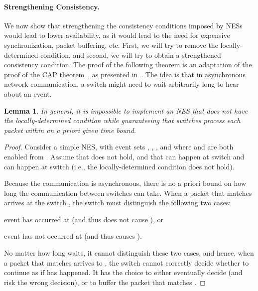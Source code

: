 \documentclass[pldi-cameraready]{sigplanconf}
\newcommand*\xmnote[3][0pt]{}
\newtheorem{lemma}{Lemma}
\begin{document}
\paragraph*{Strengthening Consistency.}
\renewcommand*{\proofname}{Proof Sketch}We now show that strengthening the consistency conditions imposed by
NESs would lead to lower availability, as it would lead to the need
for expensive synchronization, packet buffering, etc. First, we will
try to remove the locally-determined condition, and second, we will try to obtain a
strengthened consistency condition. The proof of the following theorem
is an adaptation of the proof of the CAP theorem~\cite{B00}, as
presented in~\cite{GL12}. The idea is that in asynchronous network
communication, a switch might need to wait arbitrarily long to hear
\xmnote{\FiveStar}{Q14}about an event.
\begin{lemma}
\label{lem:local}
In general, it is impossible to implement an NES that does not have 
the locally-determined condition while guaranteeing that switches
process each packet within an {a priori} given time bound.
\end{lemma}
\begin{proof}
Consider a simple NES, with event sets
, , , and where  and  are both enabled from 
. Assume that  does not hold,
and that  can happen at switch  and  
can happen at switch  (i.e., the locally-determined condition does not
hold). 

Because the communication is asynchronous, there is no a priori
bound on how long the communication between switches can take.
When a packet  that matches  arrives at the switch , the switch must
distinguish the following two cases: 
\begin{inparaenum}
\item[(\#1)] event  has occurred at  (and thus  does not cause
  ), or
\item[(\#2)] event  has not occurred at  (and thus  causes 
  ).
\end{inparaenum}
No matter how long  waits, it cannot distinguish these two cases,
and hence, when a packet that matches  arrives to , the switch
 cannot
correctly decide whether to continue as if  has happened. It has
the choice to either eventually decide (and risk the wrong decision),
or to buffer the packet that matches .  
\end{proof}
\end{document}
